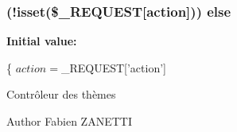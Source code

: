 \subsubsection[{else}]{ (!isset(\$\+\_\+\+R\+E\+Q\+U\+E\+S\+T\mbox{[}\textquotesingle{}action\textquotesingle{}\mbox{]})) else}\label{c__get_admin_8php_a9eb9d4aea63ebe6f016e561ea73b210a}
{\bfseries Initial value\+:}
\begin{DoxyCode}
\{
    $action = $\_REQUEST[\textcolor{stringliteral}{'action'}]
\end{DoxyCode}
Contrôleur des thèmes

\begin{DoxyAuthor}{Author}
Fabien Z\+A\+N\+E\+T\+T\+I 
\end{DoxyAuthor}
